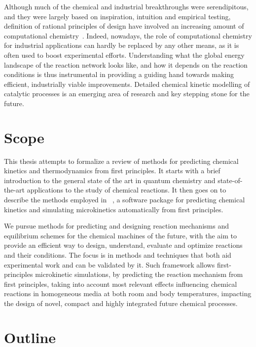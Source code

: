 Although much of the chemical and industrial breakthroughs were serendipitous,
and they were largely based on inspiration,
intuition and empirical testing,
definition of rational principles of design have involved an increasing amount of computational
chemistry~\cite{Kitchin_2012}.
Indeed,
nowadays,
the role of computational chemistry for industrial applications can
hardly be replaced by any other means,
as it is often used to boost experimental efforts.
Understanding what the global energy landscape of the reaction network looks like,
and how it depends on the reaction conditions is thus instrumental in providing a guiding hand towards making efficient,
industrially viable improvements.
Detailed chemical kinetic modelling of catalytic processes is an emerging area of research and key stepping stone for the future.

\section*{Scope}%
\label{sec:scope}

This thesis attempts to formalize a review of methods for predicting chemical
kinetics and thermodynamics from first principles.
It starts with a brief introduction to the general state of the art in quantum
chemistry and state-of-the-art applications to the study of chemical reactions.
It then goes on to describe the methods employed in
\overreact{}~\cite{Schneider_2022},
a software
package for predicting chemical kinetics and simulating microkinetics
automatically from first principles.

We pursue methods for predicting and designing reaction mechanisms
and equilibrium schemes for the chemical machines of the future,
with the aim to provide an efficient way to design,
understand,
evaluate and optimize reactions and their conditions.
The focus is in methods and techniques that both aid experimental work and can be validated by it.
Such framework allows first-principles microkinetic simulations,
by predicting the reaction mechanism from first principles,
taking into account most relevant effects influencing
chemical reactions in homogeneous media at both room and body temperatures,
impacting the design of novel,
compact and highly integrated future chemical processes.

\section*{Outline}%
\label{sec:outline}

